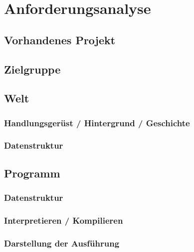 \chapter{Anforderungsanalyse}
\label{sec:requirements}


\section{Vorhandenes Projekt}
\label{sec:requirements:existing}

 \cite{riemer2016}

\section{Zielgruppe}
\label{sec:requirements:target}


\section{Welt}
\label{sec:requirements:world}


\subsection{Handlungsgerüst / Hintergrund / Geschichte}
\label{sec:requirements:world:metaphor}


\subsection{Datenstruktur}
\label{sec:requirements:world:structure}


\section{Programm}
\label{sec:requirements:program}


\subsection{Datenstruktur}
\label{sec:requirements:program:structure}


\subsection{Interpretieren / Kompilieren}
\label{sec:requirements:world:interpret-compile}


\subsection{Darstellung der Ausführung}
\label{sec:requirements:world:display}

